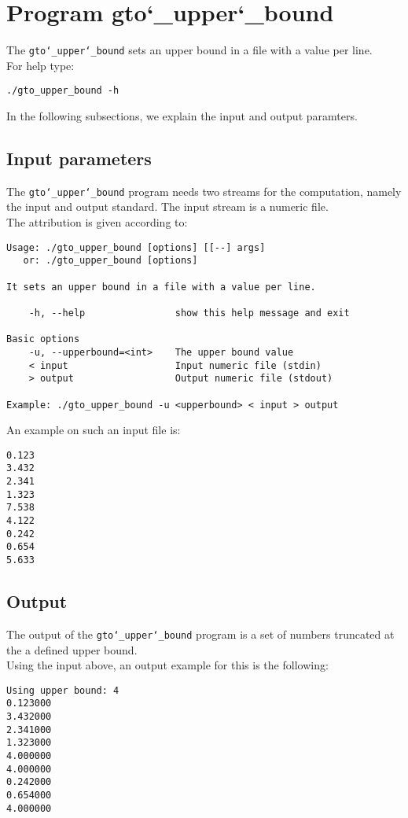 \section{Program gto\char`_upper\char`_bound}
The \texttt{gto\char`_upper\char`_bound} sets an upper bound in a file with a value per line.\\
For help type:
\begin{lstlisting}
./gto_upper_bound -h
\end{lstlisting}
In the following subsections, we explain the input and output paramters.

\subsection*{Input parameters}

The \texttt{gto\char`_upper\char`_bound} program needs two streams for the computation,
namely the input and output standard. The input stream is a numeric file.\\
The attribution is given according to:
\begin{lstlisting}
Usage: ./gto_upper_bound [options] [[--] args]
   or: ./gto_upper_bound [options]

It sets an upper bound in a file with a value per line.

    -h, --help                show this help message and exit

Basic options
    -u, --upperbound=<int>    The upper bound value
    < input                   Input numeric file (stdin)
    > output                  Output numeric file (stdout)

Example: ./gto_upper_bound -u <upperbound> < input > output
\end{lstlisting}
An example on such an input file is:
\begin{lstlisting}
0.123
3.432
2.341
1.323
7.538
4.122
0.242
0.654
5.633
\end{lstlisting}

\subsection*{Output}
The output of the \texttt{gto\char`_upper\char`_bound} program is a set of numbers truncated at the a defined upper bound.\\
Using the input above, an output example for this is the following:
\begin{lstlisting}
Using upper bound: 4
0.123000
3.432000
2.341000
1.323000
4.000000
4.000000
0.242000
0.654000
4.000000
\end{lstlisting}
